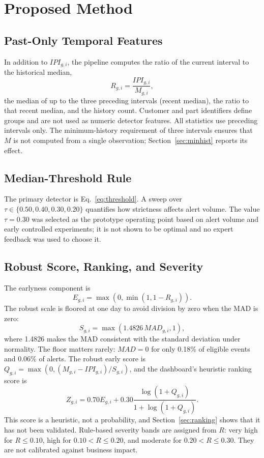 \documentclass[conference]{IEEEtran}
\begin{document}
\section{Proposed Method}
\subsection{Past-Only Temporal Features}
In addition to $IPI_{g,i}$, the pipeline computes the ratio of the current interval to the historical median,
\begin{equation}
    R_{g,i}=\frac{IPI_{g,i}}{M_{g,i}},
    \label{eq:ratio}
\end{equation}
the median of up to the three preceding intervals (recent median), the ratio to that recent median, and the history count. Customer and part identifiers define groups and are not used as numeric detector features. All statistics use preceding intervals only. The minimum-history requirement of three intervals ensures that $M$ is not computed from a single observation; Section~\ref{sec:minhist} reports its effect.

\subsection{Median-Threshold Rule}
The primary detector is Eq.~\eqref{eq:threshold}. A sweep over $\tau\in\{0.50,0.40,0.30,0.20\}$ quantifies how strictness affects alert volume. The value $\tau=0.30$ was selected as the prototype operating point based on alert volume and early controlled experiments; it is not shown to be optimal and no expert feedback was used to choose it.

\subsection{Robust Score, Ranking, and Severity}
The earlyness component is
\begin{equation}
    E_{g,i}=\max(0,\min(1,1-R_{g,i})).
    \label{eq:earlyness}
\end{equation}
The robust scale is floored at one day to avoid division by zero when the MAD is zero:
\begin{equation}
    S_{g,i}=\max(1.4826\,MAD_{g,i},1),
    \label{eq:scale}
\end{equation}
where 1.4826 makes the MAD consistent with the standard deviation under normality. The floor matters rarely: $MAD=0$ for only 0.18\% of eligible events and 0.06\% of alerts. The robust early score is $Q_{g,i}=\max(0,(M_{g,i}-IPI_{g,i})/S_{g,i})$, and the dashboard's heuristic ranking score is
\begin{equation}
    Z_{g,i}=0.70E_{g,i}+0.30\frac{\log(1+Q_{g,i})}{1+\log(1+Q_{g,i})}.
    \label{eq:rank}
\end{equation}
This score is a heuristic, not a probability, and Section~\ref{sec:ranking} shows that it has not been validated. Rule-based severity bands are assigned from $R$: very high for $R\leq0.10$, high for $0.10<R\leq0.20$, and moderate for $0.20<R\leq0.30$. They are not calibrated against business impact.
\end{document}
